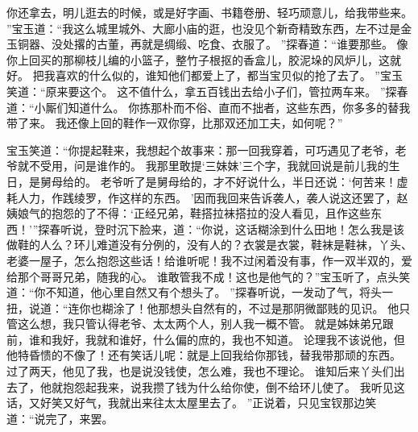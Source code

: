 你还拿去，明儿逛去的时候，或是好字画、书籍卷册、轻巧顽意儿，给我带些来。
”宝玉道：“我这么城里城外、大廊小庙的逛，也没见个新奇精致东西，左不过是金玉铜器、没处撂的古董，再就是绸缎、吃食、衣服了。
”探春道：“谁要那些。
像你上回买的那柳枝儿编的小篮子，整竹子根抠的香盒儿，胶泥垛的风炉儿，这就好。
把我喜欢的什么似的，谁知他们都爱上了，都当宝贝似的抢了去了。
”宝玉笑道：“原来要这个。
这不值什么，拿五百钱出去给小子们，管拉两车来。
”探春道：“小厮们知道什么。
你拣那朴而不俗、直而不拙者，这些东西，你多多的替我带了来。
我还像上回的鞋作一双你穿，比那双还加工夫，如何呢？”\par
宝玉笑道：“你提起鞋来，我想起个故事来：那一回我穿着，可巧遇见了老爷，老爷就不受用，问是谁作的。
我那里敢提‘三妹妹’三个字，我就回说是前儿我的生日，是舅母给的。
老爷听了是舅母给的，才不好说什么，半日还说：‘何苦来！虚耗人力，作践绫罗，作这样的东西。
’因而我回来告诉袭人，袭人说这还罢了，赵姨娘气的抱怨的了不得：‘正经兄弟，鞋搭拉袜搭拉的没人看见，且作这些东西！’”探春听说，登时沉下脸来，道：“你说，这话糊涂到什么田地！怎么我是该做鞋的人么？环儿难道没有分例的，没有人的？衣裳是衣裳，鞋袜是鞋袜，丫头、老婆一屋子，怎么抱怨这些话！给谁听呢！我不过闲着没有事，作一双半双的，爱给那个哥哥兄弟，随我的心。
谁敢管我不成！这也是他气的？”宝玉听了，点头笑道：“你不知道，他心里自然又有个想头了。
”探春听说，一发动了气，将头一扭，说道：“连你也糊涂了！他那想头自然有的，不过是那阴微鄙贱的见识。
他只管这么想，我只管认得老爷、太太两个人，别人我一概不管。
就是姊妹弟兄跟前，谁和我好，我就和谁好，什么偏的庶的，我也不知道。
论理我不该说他，但他特昏愦的不像了！还有笑话儿呢：就是上回我给你那钱，替我带那顽的东西。
过了两天，他见了我，也是说没钱使，怎么难，我也不理论。
谁知后来丫头们出去了，他就抱怨起我来，说我攒了钱为什么给你使，倒不给环儿使了。
我听见这话，又好笑又好气，我就出来往太太屋里去了。
”正说着，只见宝钗那边笑道：“说完了，来罢。
